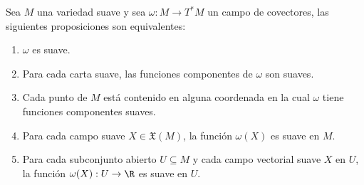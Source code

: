\begin{theorem}\label{Teorema: Criterio de Suavidad para Campos de Covectores}
	Sea $M$ una variedad suave y sea $\omega: M \to T^{*}M$ un campo de covectores, las siguientes proposiciones son equivalentes:
	\begin{enumerate}
		\item $\omega$ es suave.
		\item Para cada carta suave, las funciones componentes de $\omega$ son suaves.
		\item Cada punto de $M$ está contenido en alguna coordenada en la cual $\omega$ tiene funciones componentes suaves.
		\item Para cada campo suave $X \in \mathfrak{X}(M)$, la función $\omega(X)$ es suave en $M$.
		\item Para cada subconjunto abierto $U \subseteq M$ y cada campo vectorial suave $X$ en $U$, la función $\omega(X): U \to \R$ es suave en $U$.
	\end{enumerate}
\end{theorem}

